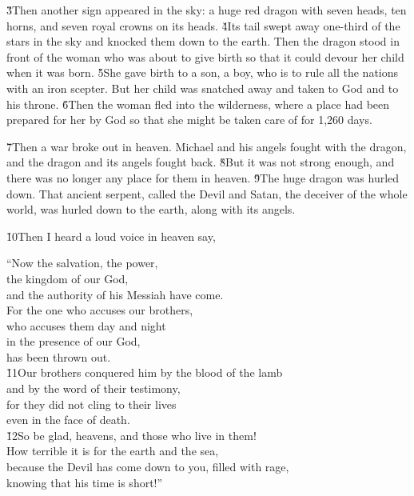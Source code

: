 \v{3}Then another sign appeared in the sky: a huge red dragon with seven heads, ten horns, and seven royal crowns on its heads. \v{4}Its tail swept away one-third of the stars in the sky and knocked them down to the earth. Then the dragon stood in front of the woman who was about to give birth so that it could devour her child when it was born. \v{5}She gave birth to a son, a boy, who is to rule all the nations with an iron scepter. But her child was snatched away and taken to God and to his throne. \v{6}Then the woman fled into the wilderness, where a place had been prepared for her by God so that she might be taken care of for 1,260 days.

\v{7}Then a war broke out in heaven. Michael and his angels fought with the dragon, and the dragon and its angels fought back. \v{8}But it was not strong enough, and there was no longer any place for them in heaven. \v{9}The huge dragon was hurled down. That ancient serpent, called the Devil and Satan, the deceiver of the whole world, was hurled down to the earth, along with its angels.

\v{10}Then I heard a loud voice in heaven say,

\begin{poetry}
\poeml ``Now the salvation, the power, \\
\poemll    the kingdom of our God, \\
\poemlll       and the authority of his Messiah have come. \\
\poeml For the one who accuses our brothers, \\
\poemll    who accuses them day and night \\
\poeml in the presence of our God, \\
\poemll    has been thrown out. \\
\poeml \v{11}Our brothers conquered him by the blood of the lamb \\
\poemll    and by the word of their testimony, \\
\poeml for they did not cling to their lives \\
\poemll    even in the face of death. \\
\poeml \v{12}So be glad, heavens, and those who live in them! \\
\poeml How terrible it is for the earth and the sea, \\
\poemll    because the Devil has come down to you, filled with rage, \\
\poemlll       knowing that his time is short!''
\end{poetry}

